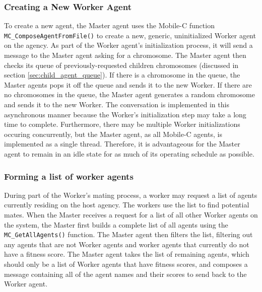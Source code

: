       \subsubsection{\label{sec:new_worker}Creating a New Worker Agent}
        To create a new agent, the Master agent uses the Mobile-C function
          \texttt{MC\_ComposeAgentFromFile()} to create a new, generic,
          uninitialized Worker agent on the agency. 
        As part of the Worker agent's initialization process, it will send a message
          to the Master agent asking for a chromosome.
        The Master agent then checks its queue of previously-requested children
          chromosomes (discussed in section \ref{sec:child_agent_queue}).
        If there is a chromosome in the queue, the Master agents pops it off
          the queue and sends it to the new Worker.
        If there are no chromosomes in the queue, the Master agent generates a random
          chromosome and sends it to the new Worker.
        The conversation is implemented in this asynchronous manner because the
          Worker's initialization step may take a long time to complete. 
        Furthermore, there may be multiple Worker initializations occuring concurrently,
          but the Master agent, as all Mobile-C agents, is implemented as a single
          thread.
        Therefore, it is advantageous for the Master agent to remain in an idle state
          for as much of its operating schedule as possible.

      \subsubsection{Forming a list of worker agents}
        During part of the Worker's mating process, a worker may request a list of
          agents currently residing on the host agency. 
        The workers use the list to find potential mates.
        When the Master receives a request for a list of all other Worker agents
          on the system, the Master first builds a complete list of all agents
          using the \texttt{MC\_GetAllAgents()} function. 
        The Master agent then filters the list, filtering out any agents that are not
          Worker agents and worker agents that currently do not have a fitness score.
        The Master agent takes the list of remaining agents, which should only
          be a list of Worker agents that have fitness scores, and composes
          a message containing all of the agent names and their scores to send back
          to the Worker agent. 


